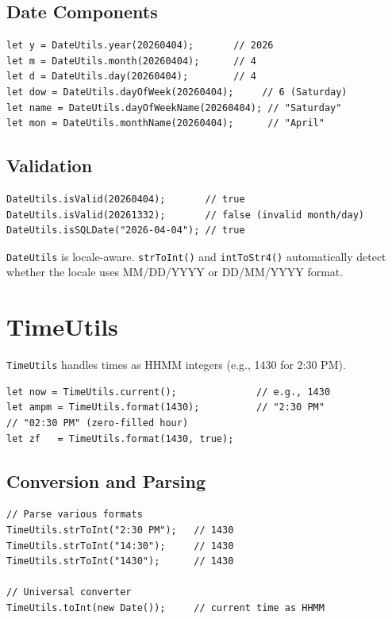 \subsection{Date Components}

\begin{lstlisting}[style=javascript]
let y = DateUtils.year(20260404);       // 2026
let m = DateUtils.month(20260404);      // 4
let d = DateUtils.day(20260404);        // 4
let dow = DateUtils.dayOfWeek(20260404);     // 6 (Saturday)
let name = DateUtils.dayOfWeekName(20260404); // "Saturday"
let mon = DateUtils.monthName(20260404);      // "April"
\end{lstlisting}

\subsection{Validation}

\begin{lstlisting}[style=javascript]
DateUtils.isValid(20260404);       // true
DateUtils.isValid(20261332);       // false (invalid month/day)
DateUtils.isSQLDate("2026-04-04"); // true
\end{lstlisting}

\begin{notebox}
\texttt{DateUtils} is locale-aware.  \texttt{strToInt()} and \texttt{intToStr4()} automatically detect whether the locale uses MM/DD/YYYY or DD/MM/YYYY format.
\end{notebox}

\section{TimeUtils}
\label{sec:feu-timeutils}

\texttt{TimeUtils} handles times as HHMM integers (e.g., 1430 for 2:30 PM).

\begin{lstlisting}[style=javascript]
let now = TimeUtils.current();              // e.g., 1430
let ampm = TimeUtils.format(1430);          // "2:30 PM"
// "02:30 PM" (zero-filled hour)
let zf   = TimeUtils.format(1430, true);
\end{lstlisting}

\subsection{Conversion and Parsing}

\begin{lstlisting}[style=javascript]
// Parse various formats
TimeUtils.strToInt("2:30 PM");   // 1430
TimeUtils.strToInt("14:30");     // 1430
TimeUtils.strToInt("1430");      // 1430

// Universal converter
TimeUtils.toInt(new Date());     // current time as HHMM
\end{lstlisting}

